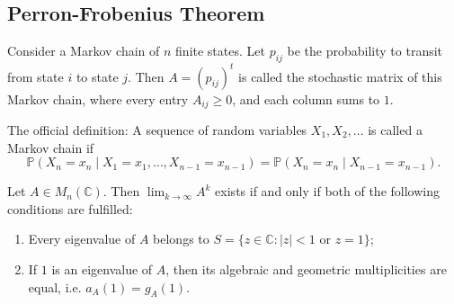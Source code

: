 \subsection{Perron-Frobenius Theorem}
\begin{definition}
Consider a Markov chain of $n$ finite states. Let $p_{ij}$ be the probability to transit from state $i$ to state $j$. Then $A=(p_{ij})^t$ is called the stochastic matrix of this Markov chain,
where every entry $A_{ij} \ge 0$, and each column sums to $1$.
\end{definition}

\begin{remark}
The official definition: A sequence of random variables $X_1, X_2, \dots$ is called a Markov chain if
\[
\mathbb{P}(X_n=x_n\mid X_1=x_1, \dots, X_{n-1}=x_{n-1})
=
\mathbb{P}(X_n=x_n\mid X_{n-1}=x_{n-1}).
\]
\end{remark}

\begin{theorem}
Let $A\in M_n(\mathbb{C})$. Then $\displaystyle\lim_{k\to\infty} A^k$ exists if and only if both of the following conditions are fulfilled:
\begin{enumerate}
    \item Every eigenvalue of $A$ belongs to $S=\{z\in\mathbb{C}: |z|<1 \text{ or } z=1\}$;
    \item If $1$ is an eigenvalue of $A$, then its algebraic and geometric multiplicities are equal, i.e. $a_A(1)=g_A(1)$.
\end{enumerate}
\label{convergence of matrix}
\end{theorem}


